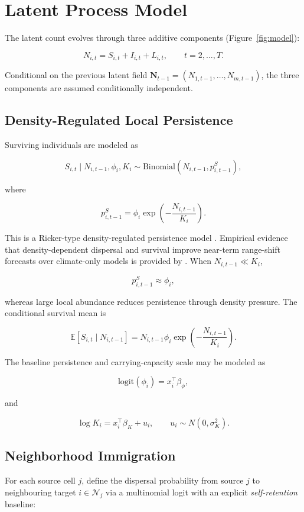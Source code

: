 \documentclass[review,12pt]{elsarticle}
\theoremstyle{definition}
\newcommand{\E}{\mathbb{E}}
\begin{document}
\section{Latent Process Model}\label{sec:process}

The latent count evolves through three additive components
(Figure~\ref{fig:model}):

\[
N_{i,t}=S_{i,t}+I_{i,t}+L_{i,t},\qquad t=2,\ldots,T.
\]

Conditional on the previous latent field \(\bm N_{t-1}=(N_{1,t-1},\ldots,N_{m,t-1})\),
the three components are assumed conditionally independent.

\subsection{Density-Regulated Local Persistence}

Surviving individuals are modeled as

\[
S_{i,t}\mid N_{i,t-1},\phi_i,K_i
\sim
\mathrm{Binomial}\left(N_{i,t-1},p^S_{i,t-1}\right),
\]

where

\[
p^S_{i,t-1}
=
\phi_i\exp\left(-\frac{N_{i,t-1}}{K_i}\right).
\]

This is a Ricker-type density-regulated persistence model \citep{turchin1998}.
Empirical evidence that density-dependent dispersal and survival improve near-term
range-shift forecasts over climate-only models is provided by \citet{pletcher2025}.
When \(N_{i,t-1}\ll K_i\),

\[
p^S_{i,t-1}\approx \phi_i,
\]

whereas large local abundance reduces persistence through density pressure. The
conditional survival mean is

\[
\E[S_{i,t}\mid N_{i,t-1}]
=
N_{i,t-1}\phi_i
\exp\left(-\frac{N_{i,t-1}}{K_i}\right).
\]

The baseline persistence and carrying-capacity scale may be modeled as

\[
\mathrm{logit}(\phi_i)=x_i^\top\beta_\phi,
\]

and

\[
\log K_i=x_i^\top\beta_K+u_i,\qquad u_i\sim N(0,\sigma_K^2).
\]

\subsection{Neighborhood Immigration}

For each source cell \(j\), define the dispersal probability from source
\(j\) to neighbouring target \(i\in\mathcal{N}_j\) via a multinomial logit
with an explicit \emph{self-retention} baseline:
\end{document}
